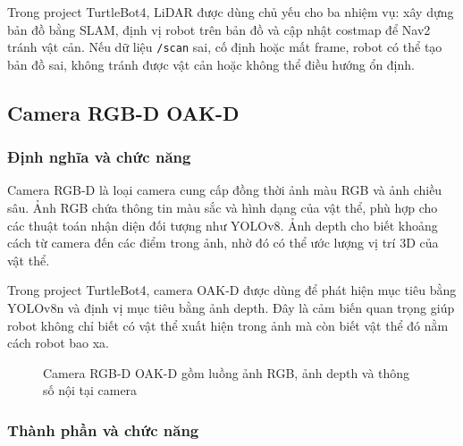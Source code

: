 Trong project TurtleBot4, LiDAR được dùng chủ yếu cho ba nhiệm vụ: xây
dựng bản đồ bằng SLAM, định vị robot trên bản đồ và cập nhật costmap để
Nav2 tránh vật cản. Nếu dữ liệu \texttt{/scan} sai, cố định hoặc mất
frame, robot có thể tạo bản đồ sai, không tránh được vật cản hoặc không
thể điều hướng ổn định.

\subsection{Camera RGB-D OAK-D}\label{subsec:rgbd}

\subsubsection{Định nghĩa và chức năng}

Camera RGB-D là loại camera cung cấp đồng thời ảnh màu RGB và ảnh chiều
sâu. Ảnh RGB chứa thông tin màu sắc và hình dạng của vật thể, phù hợp
cho các thuật toán nhận diện đối tượng như YOLOv8. Ảnh depth cho biết
khoảng cách từ camera đến các điểm trong ảnh, nhờ đó có thể ước lượng vị
trí 3D của vật thể.

Trong project TurtleBot4, camera OAK-D được dùng để phát hiện mục tiêu
bằng YOLOv8n và định vị mục tiêu bằng ảnh depth. Đây là cảm biến quan
trọng giúp robot không chỉ biết có vật thể xuất hiện trong ảnh mà còn
biết vật thể đó nằm cách robot bao xa.

\begin{figure}[H]
\centering
{}
\caption{Camera RGB-D OAK-D gồm luồng ảnh RGB, ảnh depth và thông số nội tại camera}
\label{fig:rgbd-flow}
\end{figure}

\subsubsection{Thành phần và chức năng}

